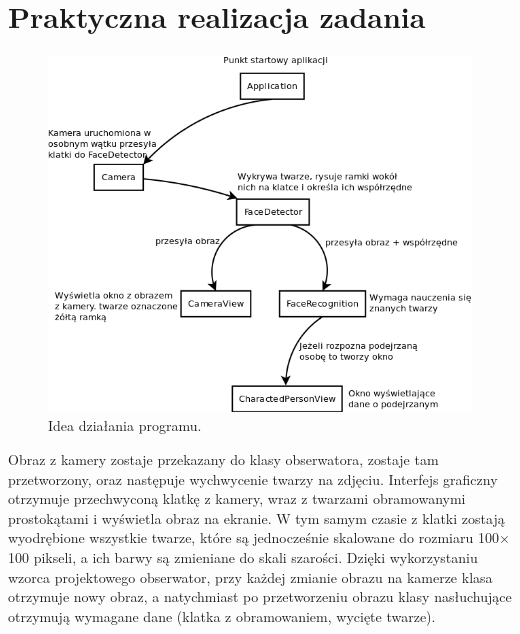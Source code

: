 \section{Praktyczna realizacja zadania}

\begin{figure}[h]
\centering
\includegraphics[scale=0.6]{./idea_dzialania_programu.png}
\caption[Idea działania programu]{Idea działania programu.}
\end{figure}

Obraz z kamery zostaje przekazany do klasy obserwatora, zostaje tam przetworzony, oraz następuje wychwycenie twarzy na zdjęciu. Interfejs graficzny otrzymuje przechwyconą klatkę z kamery, wraz z twarzami obramowanymi prostokątami i wyświetla obraz na ekranie. W tym samym czasie z klatki zostają wyodrębione wszystkie twarze, które są jednocześnie skalowane do rozmiaru 100\begin{math}\times\end{math}100 pikseli, a ich barwy są zmieniane do skali szarości. Dzięki wykorzystaniu wzorca projektowego obserwator, przy każdej zmianie obrazu na kamerze klasa otrzymuje nowy obraz, a natychmiast po przetworzeniu obrazu klasy nasłuchujące otrzymują wymagane dane (klatka z obramowaniem, wycięte twarze). 


\pagebreak[4]

